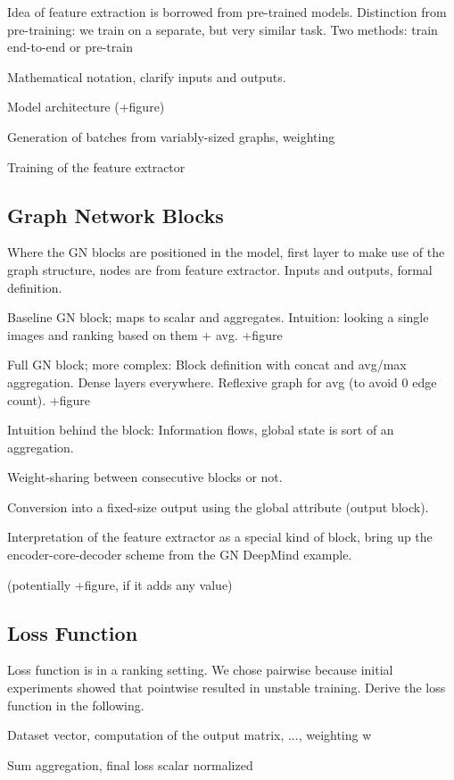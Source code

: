 Idea of feature extraction is borrowed from pre-trained models. Distinction from pre-training: we train on a separate, but very similar task. Two methods: train end-to-end or pre-train

Mathematical notation, clarify inputs and outputs.

Model architecture (+figure)

Generation of batches from variably-sized graphs, weighting

Training of the feature extractor

\subsection{Graph Network Blocks}

Where the GN blocks are positioned in the model, first layer to make use of the graph structure, nodes are from feature extractor. Inputs and outputs, formal definition.

Baseline GN block; maps to scalar and aggregates. Intuition: looking a single images and ranking based on them + avg. +figure

Full GN block; more complex: Block definition with concat and avg/max aggregation. Dense layers everywhere. Reflexive graph for avg (to avoid 0 edge count). +figure

Intuition behind the block: Information flows, global state is sort of an aggregation.

Weight-sharing between consecutive blocks or not.

Conversion into a fixed-size output using the global attribute (output block).

Interpretation of the feature extractor as a special kind of block, bring up the encoder-core-decoder scheme from the GN DeepMind example.

(potentially +figure, if it adds any value)

\subsection{Loss Function}

Loss function is in a ranking setting. We chose pairwise because initial experiments showed that pointwise resulted in unstable training. Derive the loss function in the following.

Dataset vector, computation of the output matrix, ..., weighting w

Sum aggregation, final loss scalar normalized


